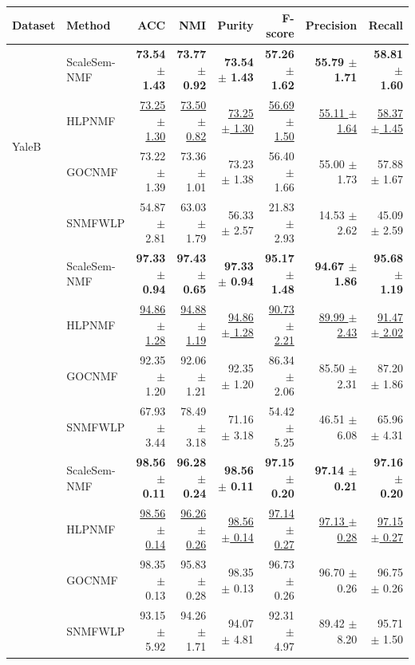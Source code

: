 \begin{tabular}{llrrrrrr}
\toprule
Dataset & Method & ACC & NMI & Purity & F-score & Precision & Recall \\
\midrule
\multirow{4}{*}{YaleB} & ScaleSem-NMF & \textbf{73.54 $\pm$ 1.43} & \textbf{73.77 $\pm$ 0.92} & \textbf{73.54 $\pm$ 1.43} & \textbf{57.26 $\pm$ 1.62} & \textbf{55.79 $\pm$ 1.71} & \textbf{58.81 $\pm$ 1.60} \\
 & HLPNMF & \underline{73.25 $\pm$ 1.30} & \underline{73.50 $\pm$ 0.82} & \underline{73.25 $\pm$ 1.30} & \underline{56.69 $\pm$ 1.50} & \underline{55.11 $\pm$ 1.64} & \underline{58.37 $\pm$ 1.45} \\
 & GOCNMF & 73.22 $\pm$ 1.39 & 73.36 $\pm$ 1.01 & 73.23 $\pm$ 1.38 & 56.40 $\pm$ 1.66 & 55.00 $\pm$ 1.73 & 57.88 $\pm$ 1.67 \\
 & SNMFWLP & 54.87 $\pm$ 2.81 & 63.03 $\pm$ 1.79 & 56.33 $\pm$ 2.57 & 21.83 $\pm$ 2.93 & 14.53 $\pm$ 2.62 & 45.09 $\pm$ 2.59 \\
\addlinespace
\multirow{4}{*}{COIL20} & ScaleSem-NMF & \textbf{97.33 $\pm$ 0.94} & \textbf{97.43 $\pm$ 0.65} & \textbf{97.33 $\pm$ 0.94} & \textbf{95.17 $\pm$ 1.48} & \textbf{94.67 $\pm$ 1.86} & \textbf{95.68 $\pm$ 1.19} \\
 & HLPNMF & \underline{94.86 $\pm$ 1.28} & \underline{94.88 $\pm$ 1.19} & \underline{94.86 $\pm$ 1.28} & \underline{90.73 $\pm$ 2.21} & \underline{89.99 $\pm$ 2.43} & \underline{91.47 $\pm$ 2.02} \\
 & GOCNMF & 92.35 $\pm$ 1.20 & 92.06 $\pm$ 1.21 & 92.35 $\pm$ 1.20 & 86.34 $\pm$ 2.06 & 85.50 $\pm$ 2.31 & 87.20 $\pm$ 1.86 \\
 & SNMFWLP & 67.93 $\pm$ 3.44 & 78.49 $\pm$ 3.18 & 71.16 $\pm$ 3.18 & 54.42 $\pm$ 5.25 & 46.51 $\pm$ 6.08 & 65.96 $\pm$ 4.31 \\
\addlinespace
\multirow{4}{*}{Optdigits} & ScaleSem-NMF & \textbf{98.56 $\pm$ 0.11} & \textbf{96.28 $\pm$ 0.24} & \textbf{98.56 $\pm$ 0.11} & \textbf{97.15 $\pm$ 0.20} & \textbf{97.14 $\pm$ 0.21} & \textbf{97.16 $\pm$ 0.20} \\
 & HLPNMF & \underline{98.56 $\pm$ 0.14} & \underline{96.26 $\pm$ 0.26} & \underline{98.56 $\pm$ 0.14} & \underline{97.14 $\pm$ 0.27} & \underline{97.13 $\pm$ 0.28} & \underline{97.15 $\pm$ 0.27} \\
 & GOCNMF & 98.35 $\pm$ 0.13 & 95.83 $\pm$ 0.28 & 98.35 $\pm$ 0.13 & 96.73 $\pm$ 0.26 & 96.70 $\pm$ 0.26 & 96.75 $\pm$ 0.26 \\
 & SNMFWLP & 93.15 $\pm$ 5.92 & 94.26 $\pm$ 1.71 & 94.07 $\pm$ 4.81 & 92.31 $\pm$ 4.97 & 89.42 $\pm$ 8.20 & 95.71 $\pm$ 1.50 \\

\end{tabular}
